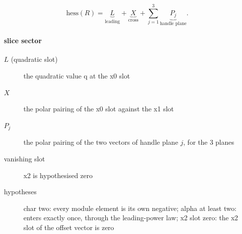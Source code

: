 \[\mathrm{hess}(R)=\underbrace{L}_{\text{leading}}+\underbrace{X}_{\text{cross}}+\sum_{j=1}^{3}\underbrace{P_j}_{\text{handle plane}}.\]
\paragraph{slice sector}
\begin{description}
\item[$L$ (quadratic slot)] the quadratic value q at the x0 slot
\item[$X$] the polar pairing of the x0 slot against the x1 slot
\item[$P_j$] the polar pairing of the two vectors of handle plane $j$, for the 3 planes
\item[vanishing slot] x2 is hypothesised zero
\item[hypotheses] char two: every module element is its own negative; alpha at least two: enters exactly once, through the leading-power law; x2 slot zero: the x2 slot of the offset vector is zero
\end{description}
